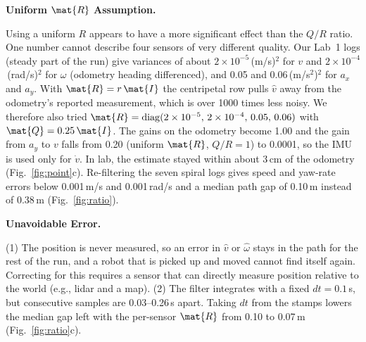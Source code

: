 \documentclass[11pt,twoside,letterpaper]{article}
\newcommand{\para}[1]{\textbf{#1}\quad}
\begin{document}
\para{Uniform $\mat{R}$ Assumption.}

Using a uniform $R$ appears to have a more significant effect than the $Q/R$ ratio.
One number cannot describe four sensors of very different quality.
Our Lab~1 logs (steady part of the run) give variances of about $2\times10^{-5}$\,(m/s)$^2$ for $v$
and $2\times10^{-4}$\,(rad/s)$^2$ for $\omega$ (odometry heading differenced), and 0.05 and 0.06\,(m/s$^2$)$^2$ for $a_x$ and $a_y$.
With $\mat{R}=r\,\mat{I}$ the centripetal row pulls $\hat v$ away from the odometry's reported measurement, which is over 1000 times less noisy.
We therefore also tried $\mat{R}=\mathrm{diag}(2\times10^{-5},\,2\times10^{-4},\,0.05,\,0.06)$ with $\mat{Q}=0.25\,\mat{I}$.
The gains on the odometry become 1.00 and the gain from $a_y$ to $v$ falls from 0.20 (uniform $\mat{R}$, $Q/R=1$) to 0.0001, so the IMU is used only for $\dot v$.
In lab, the estimate stayed within about 3\,cm of the odometry (Fig.~\ref{fig:point}c).
Re-filtering the seven spiral logs gives speed and yaw-rate errors below 0.001\,m/s and 0.001\,rad/s and a median path gap of 0.10\,m instead of 0.38\,m (Fig.~\ref{fig:ratio}).

\para{Unavoidable Error.} 

(1) The position is never measured, so an error in $\hat v$ or $\hat\omega$ stays in the path for the rest of the run, and a robot that is picked up and moved cannot find itself again.
Correcting for this requires a sensor that can directly measure position relative to the world (e.g., lidar and a map).
(2) The filter integrates with a fixed $dt=0.1$\,s, but consecutive samples are 0.03--0.26\,s apart.
Taking $dt$ from the stamps lowers the median gap left with the per-sensor $\mat{R}$ from 0.10 to 0.07\,m (Fig.~\ref{fig:ratio}c).
\end{document}
